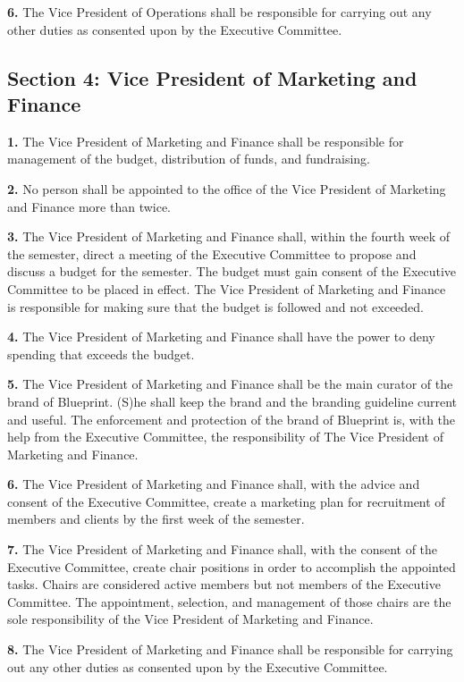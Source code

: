 \documentclass{article}
\begin{document}
\textbf{6.} The Vice President of Operations shall be responsible for carrying out any other duties as consented upon by the Executive Committee.

\subsection{Section 4: Vice President of Marketing and Finance}

\textbf{1.} The Vice President of Marketing and Finance shall be responsible for management of the budget, distribution of funds, and fundraising.

\textbf{2.} No person shall be appointed to the office of the Vice President of Marketing and Finance more than twice.

\textbf{3.} The Vice President of Marketing and Finance shall, within the fourth week of the semester, direct a meeting of the Executive Committee to propose and discuss a budget for the semester. The budget must gain consent of the Executive Committee to be placed in effect. The Vice President of Marketing and Finance is responsible for making sure that the budget is followed and not exceeded.

\textbf{4.} The Vice President of Marketing and Finance shall have the power to deny spending that exceeds the budget.

\textbf{5.} The Vice President of Marketing and Finance shall be the main curator of the brand of Blueprint. (S)he shall keep the brand and the branding guideline current and useful. The enforcement and protection of the brand of Blueprint is, with the help from the Executive Committee, the responsibility of The Vice President of Marketing and Finance.

\textbf{6.} The Vice President of Marketing and Finance shall, with the advice and consent of the Executive Committee, create a marketing plan for recruitment of members and clients by the first week of the semester.

\textbf{7.} The Vice President of Marketing and Finance shall, with the consent of the Executive Committee, create chair positions in order to accomplish the appointed tasks. Chairs are considered active members but not members of the Executive Committee. The appointment, selection, and management of those chairs are the sole responsibility of the Vice President of Marketing and Finance.

\textbf{8.} The Vice President of Marketing and Finance shall be responsible for carrying out any other duties as consented upon by the Executive Committee.
\end{document}
